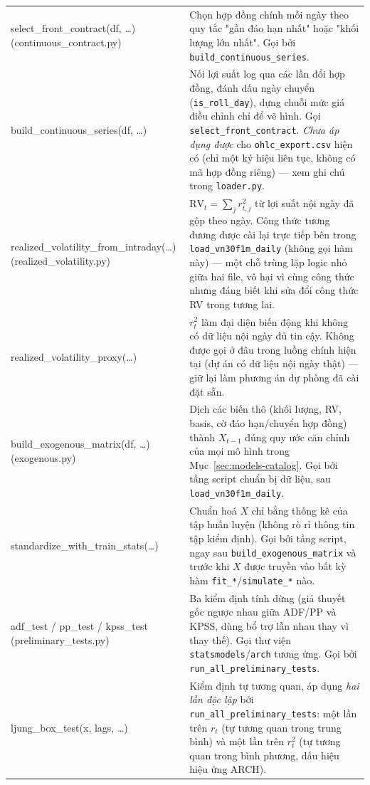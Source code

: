\documentclass[11pt,a4paper]{article}
\newcommand{\code}[1]{\texttt{#1}}
\newcommand{\file}[1]{\texttt{#1}}
\begin{document}
\begin{longtable}{@{}>{\ttfamily\scriptsize\raggedright\arraybackslash}p{5.0cm} >{\raggedright\arraybackslash}p{9.5cm}@{}}
select\_front\_contract(df, \ldots) \newline \footnotesize{(continuous\_contract.py)} & Chọn hợp đồng chính mỗi ngày theo quy tắc "gần đáo hạn nhất" hoặc "khối lượng lớn nhất". Gọi bởi \code{build\_continuous\_series}. \\
build\_continuous\_series(df, \ldots) & Nối lợi suất log qua các lần đổi hợp đồng, đánh dấu ngày chuyển (\code{is\_roll\_day}), dựng chuỗi mức giá điều chỉnh chỉ để vẽ hình. Gọi \code{select\_front\_contract}. \emph{Chưa áp dụng được} cho \file{ohlc\_export.csv} hiện có (chỉ một ký hiệu liên tục, không có mã hợp đồng riêng) --- xem ghi chú trong \code{loader.py}. \\
realized\_volatility\_\allowbreak from\_intraday(\ldots) \newline \footnotesize{(realized\_volatility.py)} & $\mathrm{RV}_t=\sum_j r_{t,j}^2$ từ lợi suất nội ngày đã gộp theo ngày. Công thức tương đương được cài lại trực tiếp bên trong \code{load\_vn30f1m\_daily} (không gọi hàm này) --- một chỗ trùng lặp logic nhỏ giữa hai file, vô hại vì cùng công thức nhưng đáng biết khi sửa đổi công thức RV trong tương lai. \\
realized\_volatility\_proxy(\ldots) & $r_t^2$ làm đại diện biến động khi không có dữ liệu nội ngày đủ tin cậy. Không được gọi ở đâu trong luồng chính hiện tại (dự án có dữ liệu nội ngày thật) --- giữ lại làm phương án dự phòng đã cài đặt sẵn. \\
build\_exogenous\_matrix(df, \ldots) \newline \footnotesize{(exogenous.py)} & Dịch các biến thô (khối lượng, RV, basis, cờ đáo hạn/chuyển hợp đồng) thành $X_{t-1}$ đúng quy ước căn chỉnh của mọi mô hình trong Mục~\ref{sec:models-catalog}. Gọi bởi tầng script chuẩn bị dữ liệu, sau \code{load\_vn30f1m\_daily}. \\
standardize\_with\_train\_stats(\ldots) & Chuẩn hoá $X$ chỉ bằng thống kê của tập huấn luyện (không rò rỉ thông tin tập kiểm định). Gọi bởi tầng script, ngay sau \code{build\_exogenous\_matrix} và trước khi $X$ được truyền vào bất kỳ hàm \code{fit\_*}/\code{simulate\_*} nào. \\
adf\_test / pp\_test / kpss\_test \newline \footnotesize{(preliminary\_tests.py)} & Ba kiểm định tính dừng (giả thuyết gốc ngược nhau giữa ADF/PP và KPSS, dùng bổ trợ lẫn nhau thay vì thay thế). Gọi thư viện \code{statsmodels}/\code{arch} tương ứng. Gọi bởi \code{run\_all\_preliminary\_tests}. \\
ljung\_box\_test(x, lags, \ldots) & Kiểm định tự tương quan, áp dụng \emph{hai lần độc lập} bởi \code{run\_all\_preliminary\_tests}: một lần trên $r_t$ (tự tương quan trong trung bình) và một lần trên $r_t^2$ (tự tương quan trong bình phương, dấu hiệu hiệu ứng ARCH). \\

\end{longtable}
\end{document}
